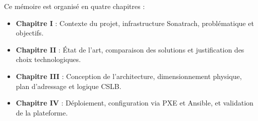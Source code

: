 \par Ce mémoire est organisé en quatre chapitres :
\begin{itemize}
    \item \textbf{Chapitre I} : Contexte du projet, infrastructure Sonatrach, problématique et objectifs.
    \item \textbf{Chapitre II} : État de l'art, comparaison des solutions et justification des choix technologiques.
    \item \textbf{Chapitre III} : Conception de l'architecture, dimensionnement physique, plan d'adressage et logique CSLB.
    \item \textbf{Chapitre IV} : Déploiement, configuration via PXE et Ansible, et validation de la plateforme.
\end{itemize}
